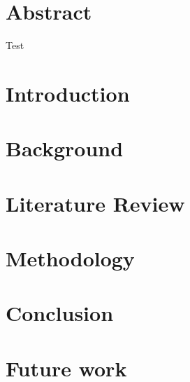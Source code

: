 \documentclass[twocolumn]{article}
\begin{document}
    \section*{Abstract}\label{sec:abstract}

    Test\cite{lol}

    \section{Introduction}\label{sec:introduction}
    

    \section{Background}\label{sec:background}
    

    \section{Literature Review}\label{sec:literature-review}
    

    \section{Methodology}\label{sec:methodology}
    

    \section{Conclusion}\label{sec:conclusion}

    \section{Future work}\label{sec:futurework}
    
    \printbibliography
\end{document}

